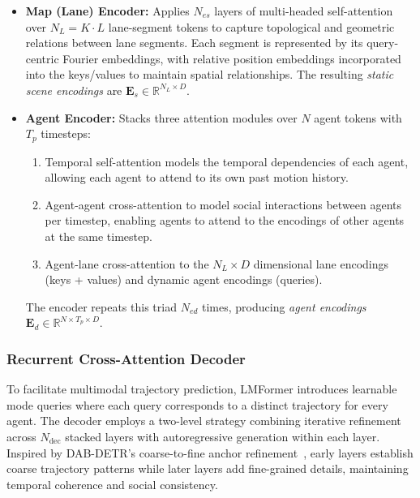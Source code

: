 \begin{itemize}[leftmargin=*]
    \item \textbf{Map (Lane) Encoder:}
        Applies \(N_{es}\) layers of multi-headed self-attention over \(N_L = K \cdot L\) lane-segment tokens to capture  topological and geometric relations between lane segments. Each segment is represented by its query-centric Fourier embeddings, with relative position embeddings incorporated into the keys/values to maintain spatial relationships. The resulting \emph{static scene encodings} are \(\mathbf{E}_s \in \mathbb{R}^{N_L \times D}\).
  \item \textbf{Agent Encoder:}
        Stacks three attention modules over \(N\) agent tokens with \(T_{p}\) timesteps:
        \begin{enumerate}
          \item Temporal self-attention models the temporal dependencies of each agent, allowing each agent to attend to its own past motion history.
          \item Agent-agent cross-attention to model social interactions between agents per timestep, enabling agents to attend to the encodings of other agents at the same timestep.
          \item Agent-lane cross-attention to the \(N_L \times D \) dimensional lane encodings (keys + values) and dynamic agent encodings (queries).
        \end{enumerate}
        The encoder repeats this triad \(N_{ed}\) times, producing \emph{agent encodings} \(\mathbf{E}_d \in \mathbb{R}^{N \times T_{p} \times D}\).
\end{itemize}

\subsubsection{Recurrent Cross-Attention Decoder}

To facilitate multimodal trajectory prediction, LMFormer introduces learnable mode queries where each query corresponds to a distinct trajectory for every agent. The decoder employs a two-level strategy combining iterative refinement across \(N_{\text{dec}}\) stacked layers with autoregressive generation within each layer. Inspired by DAB-DETR's coarse-to-fine anchor refinement~\cite{liu2022dabdetr}, early layers establish coarse trajectory patterns while later layers add fine-grained details, maintaining temporal coherence and social consistency.

